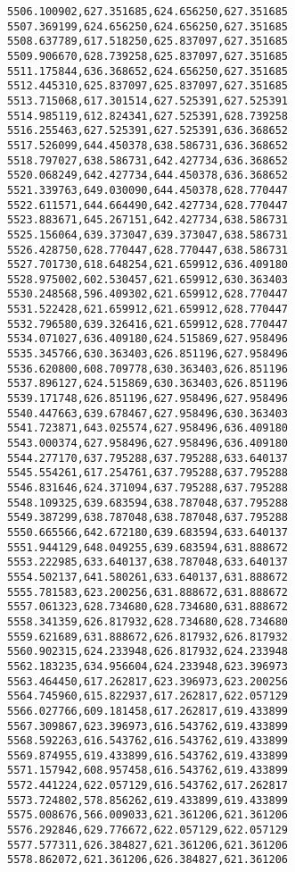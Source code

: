 \documentclass[11pt]{article}
\begin{document}
\begin{Verbatim}[commandchars=\\\{\}]
5506.100902,627.351685,624.656250,627.351685
5507.369199,624.656250,624.656250,627.351685
5508.637789,617.518250,625.837097,627.351685
5509.906670,628.739258,625.837097,627.351685
5511.175844,636.368652,624.656250,627.351685
5512.445310,625.837097,625.837097,627.351685
5513.715068,617.301514,627.525391,627.525391
5514.985119,612.824341,627.525391,628.739258
5516.255463,627.525391,627.525391,636.368652
5517.526099,644.450378,638.586731,636.368652
5518.797027,638.586731,642.427734,636.368652
5520.068249,642.427734,644.450378,636.368652
5521.339763,649.030090,644.450378,628.770447
5522.611571,644.664490,642.427734,628.770447
5523.883671,645.267151,642.427734,638.586731
5525.156064,639.373047,639.373047,638.586731
5526.428750,628.770447,628.770447,638.586731
5527.701730,618.648254,621.659912,636.409180
5528.975002,602.530457,621.659912,630.363403
5530.248568,596.409302,621.659912,628.770447
5531.522428,621.659912,621.659912,628.770447
5532.796580,639.326416,621.659912,628.770447
5534.071027,636.409180,624.515869,627.958496
5535.345766,630.363403,626.851196,627.958496
5536.620800,608.709778,630.363403,626.851196
5537.896127,624.515869,630.363403,626.851196
5539.171748,626.851196,627.958496,627.958496
5540.447663,639.678467,627.958496,630.363403
5541.723871,643.025574,627.958496,636.409180
5543.000374,627.958496,627.958496,636.409180
5544.277170,637.795288,637.795288,633.640137
5545.554261,617.254761,637.795288,637.795288
5546.831646,624.371094,637.795288,637.795288
5548.109325,639.683594,638.787048,637.795288
5549.387299,638.787048,638.787048,637.795288
5550.665566,642.672180,639.683594,633.640137
5551.944129,648.049255,639.683594,631.888672
5553.222985,633.640137,638.787048,633.640137
5554.502137,641.580261,633.640137,631.888672
5555.781583,623.200256,631.888672,631.888672
5557.061323,628.734680,628.734680,631.888672
5558.341359,626.817932,628.734680,628.734680
5559.621689,631.888672,626.817932,626.817932
5560.902315,624.233948,626.817932,624.233948
5562.183235,634.956604,624.233948,623.396973
5563.464450,617.262817,623.396973,623.200256
5564.745960,615.822937,617.262817,622.057129
5566.027766,609.181458,617.262817,619.433899
5567.309867,623.396973,616.543762,619.433899
5568.592263,616.543762,616.543762,619.433899
5569.874955,619.433899,616.543762,619.433899
5571.157942,608.957458,616.543762,619.433899
5572.441224,622.057129,616.543762,617.262817
5573.724802,578.856262,619.433899,619.433899
5575.008676,566.009033,621.361206,621.361206
5576.292846,629.776672,622.057129,622.057129
5577.577311,626.384827,621.361206,621.361206
5578.862072,621.361206,626.384827,621.361206

\end{Verbatim}
\end{document}
